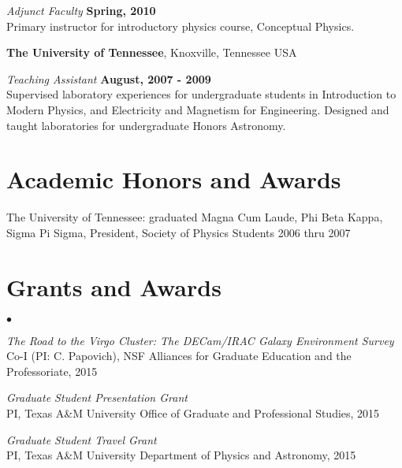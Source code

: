\documentclass[margin,line, 11pt]{res}
\newenvironment{list2}{
  \begin{list}{$\bullet$}{%
      \setlength{\itemsep}{0in}
      \setlength{\parsep}{0in} \setlength{\parskip}{0in}
      \setlength{\topsep}{0in} \setlength{\partopsep}{0in} 
      \setlength{\leftmargin}{0.2in}}}{\end{list}}
\begin{document}
\begin{resume}
\emph{Adjunct Faculty} \hfill \textbf{Spring, 2010}\\
Primary instructor for introductory physics course, Conceptual Physics.
\vspace*{3mm}

\textbf{The University of Tennessee}, Knoxville, Tennessee USA

\emph{Teaching Assistant} \hfill \textbf{August, 2007 - 2009}\\
Supervised laboratory experiences for undergraduate students in Introduction to Modern Physics, and Electricity and Magnetism for Engineering. Designed and taught laboratories for undergraduate Honors Astronomy.
\vspace*{-3mm}

\section{\sc Academic Honors and Awards} 
The University of Tennessee: graduated Magna Cum Laude, Phi Beta Kappa, Sigma
Pi Sigma, President, Society of Physics Students 2006 thru 2007
\newpage
\section{\sc Grants and Awards}
\begin{list2}
    \item \emph{The Road to the Virgo Cluster: The DECam/IRAC Galaxy Environment Survey}\\
	Co-I (PI: C. Papovich), NSF Alliances for Graduate Education and the Professoriate, 2015
	\item \emph{Graduate Student Presentation Grant}\\
	PI, Texas A\&M University Office of Graduate and Professional Studies, 2015
	\item \emph{Graduate Student Travel Grant}\\
	PI, Texas A\&M University Department of Physics and Astronomy, 2015
\end{list2}


\end{resume}
\end{document}
